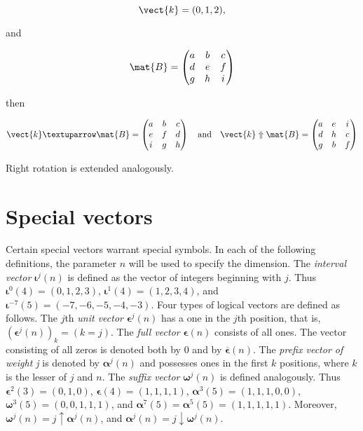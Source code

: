 $$
  \vect{k} = (0, 1, 2),
$$

\noindent and

$$
  \mat{B} = \begin{pmatrix} a & b & c \\ d & e & f \\ g & h & i \end{pmatrix}
$$

\noindent then

$$
  \vect{k} ↑ \mat{B} = \begin{pmatrix} a & b & c \\ e & f & d \\ i & g & h \end{pmatrix}
  \quad \text{and} \quad
  \vect{k} \Uparrow \mat{B} = \begin{pmatrix} a & e & i \\ d & h & c \\ g & b & f \end{pmatrix}
$$

\par Right rotation is extended analogously.

\section{Special vectors}

\par Certain special vectors warrant special symbols. In each of the following definitions, the parameter $n$ will be used to specify the dimension. The \textit{interval vector} $\textbf{ι}^j(n)$ is defined as the vector of integers beginning with $j$. Thus $\textbf{ι}^0(4)=(0, 1, 2, 3)$, $\textbf{ι}^1(4)=(1, 2, 3, 4)$, and $\textbf{ι}^{-7}(5)= (-7, -6, -5, -4, -3)$. Four types of logical vectors are defined as follows. The $j$th \textit{unit vector} $\textbf{ϵ}^j(n)$ has a one in the $j$th position, that is, $(\textbf{ϵ}^j(n))_k = (k = j)$. The \textit{full vector} $\textbf{ϵ}(n)$ consists of all ones. The vector consisting of all zeros is denoted both by $0$ and by $\overbar{\textbf{ϵ}}(n)$. The \textit{prefix vector of weight j} is denoted by $\mathbf{α}^j(n)$ and possesses ones in the first $k$ positions, where $k$ is the lesser of $j$ and $n$. The \textit{suffix vector} $\textbf{ω}^j(n)$ is defined analogously. Thus $\textbf{ϵ}^2(3) = (0, 1, 0)$, $\textbf{ϵ}(4) = (1, 1, 1, 1)$, $\mathbf{α}^3(5) = (1, 1, 1, 0, 0)$, $\textbf{ω}^3(5) = (0, 0, 1, 1, 1)$, and $\mathbf{α}^7(5) = \mathbf{α}^5(5) = (1, 1, 1, 1, 1)$. Moreover, $\textbf{ω}^j(n) = j ↑ \mathbf{α}^j(n)$, and $\mathbf{α}^j(n) = j ↓ \textbf{ω}^j(n)$.

